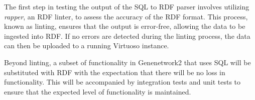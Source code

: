 The first step in testing the output of the SQL to RDF parser involves utilizing \textit{rapper}, an RDF linter, to assess the accuracy of the RDF format.  This process, known as linting, ensures that the output is error-free, allowing the data to be ingested into RDF.  If no errors are detected during the linting process, the data can then be uploaded to a running Virtuoso instance.

Beyond linting, a subset of functionality in Genenetwork2 that uses SQL will be substituted with RDF with the expectation that there will be no loss in functionality.  This will be accompanied by integration tests and unit tests to ensure that the expected level of functionality is maintained.
